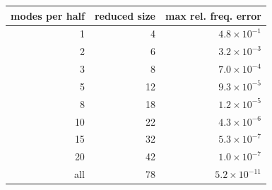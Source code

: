 \begin{tabular}{rrr}
\toprule
modes per half & reduced size & max rel. freq. error \\
\midrule
1 & 4 & $4.8\times10^{-1}$ \\
2 & 6 & $3.2\times10^{-3}$ \\
3 & 8 & $7.0\times10^{-4}$ \\
5 & 12 & $9.3\times10^{-5}$ \\
8 & 18 & $1.2\times10^{-5}$ \\
10 & 22 & $4.3\times10^{-6}$ \\
15 & 32 & $5.3\times10^{-7}$ \\
20 & 42 & $1.0\times10^{-7}$ \\
all & 78 & $5.2\times10^{-11}$ \\
\bottomrule
\end{tabular}
